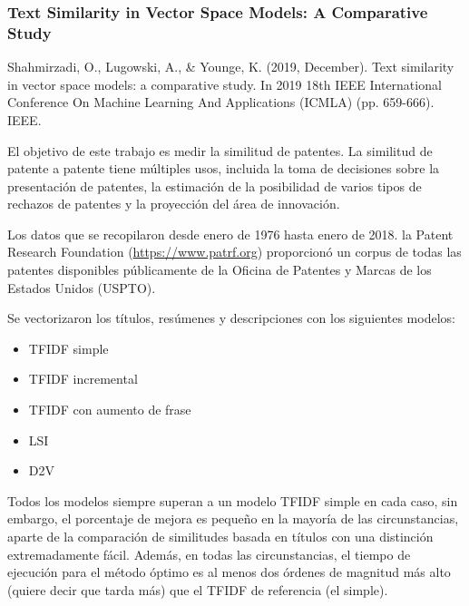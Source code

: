 \documentclass[12pt]{article}
\begin{document}
			
			\subsubsection{Text Similarity in Vector Space Models: A Comparative Study}
			Shahmirzadi, O., Lugowski, A., \& Younge, K. (2019, December). Text similarity in vector space models: a comparative study. In 2019 18th IEEE International Conference On Machine Learning And Applications (ICMLA) (pp. 659-666). IEEE.			
			
			El objetivo de este trabajo es medir la similitud de patentes. La similitud de patente a patente tiene múltiples usos, incluida la toma de decisiones sobre la presentación de patentes, la estimación de la posibilidad de varios tipos de rechazos de patentes y la proyección del área de innovación.
			
			Los datos que se recopilaron desde enero de 1976 hasta enero de 2018. la Patent Research Foundation (\url{https://www.patrf.org}) proporcionó un corpus de todas las patentes disponibles públicamente de la Oficina de Patentes y Marcas de los Estados Unidos (USPTO).
			
			Se vectorizaron los títulos, resúmenes y descripciones con los siguientes modelos:
			
			\begin{itemize}
				\item TFIDF simple
				
				\item TFIDF incremental
				
				\item TFIDF con aumento de frase
				
				\item LSI
				
				\item D2V
				
			\end{itemize}
			
			Todos los modelos siempre superan a un modelo TFIDF simple en cada caso, sin embargo, el porcentaje de mejora es pequeño en la mayoría de las circunstancias, aparte de la comparación de similitudes basada en títulos con una distinción extremadamente fácil. Además, en todas las circunstancias, el tiempo de ejecución para el método óptimo es al menos dos órdenes de magnitud más alto (quiere decir que tarda más) que el TFIDF de referencia (el simple). 
			
\end{document}
